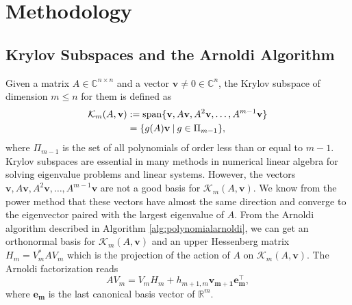 \section{Methodology}
\label{sec:methods}

\subsection{Krylov Subspaces and the Arnoldi Algorithm}\label{sec:arnoldi}
Given a matrix $A \in \mathbb{C}^{n \times n}$ and a vector $\mathbf{v} \neq 0 \in \mathbb{C}^n$,
the Krylov subspace of dimension $m \leq n$ for them is defined \cite{golub2013matrix} as
\begin{equation}
    \label{eq:krylovsubspacedefinition}
    \begin{aligned}
        \mathcal{K}_m(A, \mathbf{v})
        & :=\operatorname{span}\{\mathbf{v}, A\mathbf{v}, A^{2}\mathbf{v}, \dots, A^{m-1}\mathbf{v} \}\\
         & = \{g(A)\mathbf{v} \:|\: g \in \Pi_{m-1} \},
    \end{aligned}
\end{equation}
where $\Pi_{m-1}$ is the set of all polynomials of order less than or equal to $m-1$.
Krylov subspaces are essential in many methods in numerical linear algebra
for solving eigenvalue problems and linear systems.
However, the vectors $\mathbf{v}, A\mathbf{v}, A^{2}\mathbf{v}, \dots, A^{m-1}\mathbf{v}$
are not a good basis for $\mathcal{K}_m(A, \mathbf{v})$. We know from the power method that
these vectors have almost the same direction and converge to the eigenvector paired
with the largest eigenvalue of $A$.
From the Arnoldi algorithm \cite{trefethen1997numerical} described in Algorithm
\ref{alg:polynomialarnoldi}, we can get an orthonormal basis for $\mathcal{K}_m(A, \mathbf{v})$
and an upper Hessenberg matrix $H_m = V_m^* A V_m$ which is the projection of the action of
$A$ on $\mathcal{K}_m(A, \mathbf{v})$. The Arnoldi factorization reads
\begin{equation}
    \label{eq:arnoldifactorization}
    A V_m = V_m H_m + h_{m+1, m} \mathbf{v_{m+1}} \mathbf{e_m^\top},
\end{equation}
where $\mathbf{e_m}$ is the last canonical basis vector of $\mathbb{R}^{m}$.

